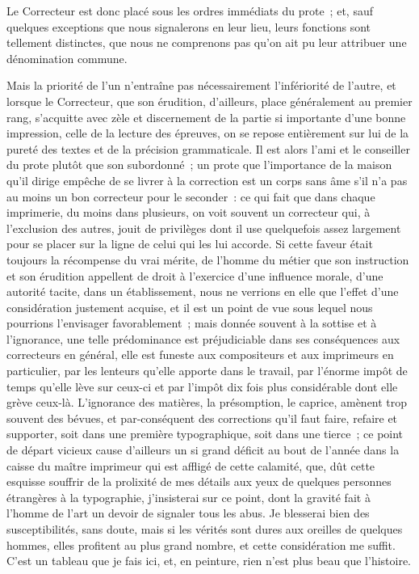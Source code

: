 \documentclass[french,twoside]{book} %
\begin{document}
Le Correcteur est donc placé sous les ordres immédiats du prote ; et, sauf quelques exceptions que nous signalerons en leur lieu, leurs fonctions sont tellement distinctes, que nous ne comprenons pas qu’on ait pu leur attribuer une dénomination commune.\par
 Mais la priorité de l’un n’entraîne pas nécessairement l’infériorité de l’autre, et lorsque le Correcteur, que son érudition, d’ailleurs, place généralement au premier rang, s’acquitte avec zèle et discernement de la partie si importante d’une bonne impression, celle de la lecture des épreuves, on se repose entièrement sur lui de la pureté des textes et de la précision grammaticale. Il est alors l’ami et le conseiller du prote plutôt que son subordonné ; un prote que l’importance de la maison qu’il dirige empêche de se livrer à la correction est un corps sans âme s’il n’a pas au moins un bon correcteur pour le seconder : ce qui fait que dans chaque imprimerie, du moins dans plusieurs, on voit souvent un correcteur qui, à l’exclusion des autres, jouit de privilèges dont il use quelquefois assez largement pour se placer sur la ligne de celui qui les lui accorde. Si cette faveur était toujours la récompense du vrai  mérite, de l’homme du métier que son instruction et son érudition appellent de droit à l’exercice d’une influence morale, d’une autorité tacite, dans un établissement, nous ne verrions en elle que l’effet d’une considération justement acquise, et il est un point de vue sous lequel nous pourrions l’envisager favorablement ; mais donnée souvent à la sottise et à l’ignorance, une telle prédominance est préjudiciable dans ses conséquences aux correcteurs en général, elle est funeste aux compositeurs et aux imprimeurs en particulier, par les lenteurs qu’elle apporte dans le travail, par l’énorme impôt de temps qu’elle lève sur ceux-ci et par l’impôt dix fois plus considérable dont elle grève ceux-là. L’ignorance des matières, la présomption, le caprice, amènent trop souvent des bévues, et par-conséquent des corrections qu’il faut faire, refaire et supporter, soit dans une première typographique, soit dans une tierce ; ce point  de départ vicieux cause d’ailleurs un si grand déficit au bout de l’année dans la caisse du maître imprimeur qui est affligé de cette calamité, que, dût cette esquisse souffrir de la prolixité de mes détails aux yeux de quelques personnes étrangères à la typographie, j’insisterai sur ce point, dont la gravité fait à l’homme de l’art un devoir de signaler tous les abus. Je blesserai bien des susceptibilités, sans doute, mais si les vérités sont dures aux oreilles de quelques hommes, elles profitent au plus grand nombre, et cette considération me suffit. C’est un tableau que je fais ici, et, en peinture, rien n’est plus beau que l’histoire.\par
\end{document}
